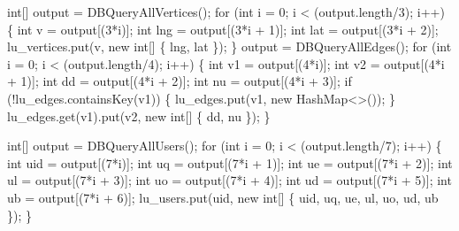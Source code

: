 \documentclass{article}
\def\nwendcode{\endtrivlist \endgroup}      %
\let\nwdocspar=\par
\theoremstyle{definition}                   %
\begin{document}
int[] output = DBQueryAllVertices();
for (int i = 0; i < (output.length/3); i++) \{
  int v = output[(3*i)];
  int lng = output[(3*i + 1)];
  int lat = output[(3*i + 2)];
  lu_vertices.put(v, new int[] \{ lng, lat \});
\}
output = DBQueryAllEdges();
for (int i = 0; i < (output.length/4); i++) \{
  int v1 = output[(4*i)];
  int v2 = output[(4*i + 1)];
  int dd = output[(4*i + 2)];
  int nu = output[(4*i + 3)];
  if (!lu_edges.containsKey(v1)) \{
    lu_edges.put(v1, new HashMap<>());
  \}
  lu_edges.get(v1).put(v2, new int[] \{ dd, nu \});
\}
\nwendcode{}\nwdocspar
\nwenddocs{}\endmoddef{}
int[] output = DBQueryAllUsers();
for (int i = 0; i < (output.length/7); i++) \{
  int uid = output[(7*i)];
  int uq = output[(7*i + 1)];
  int ue = output[(7*i + 2)];
  int ul = output[(7*i + 3)];
  int uo = output[(7*i + 4)];
  int ud = output[(7*i + 5)];
  int ub = output[(7*i + 6)];
  lu_users.put(uid, new int[] \{ uid, uq, ue, ul, uo, ud, ub \});
\}
\nwendcode{}\nwdocspar
\end{document}
